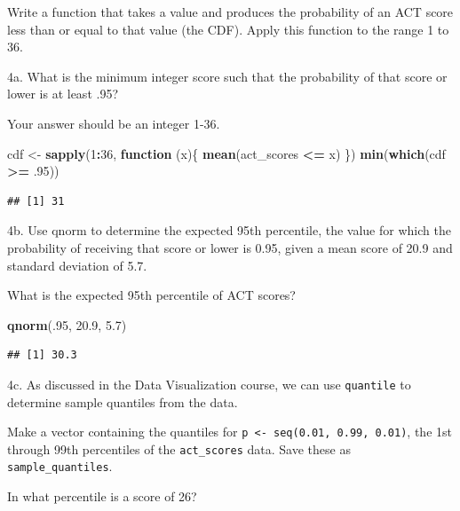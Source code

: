 \documentclass[
]{article}
\newenvironment{Shaded}{\begin{snugshade}}{\end{snugshade}}
\newcommand{\ControlFlowTok}[1]{\textcolor[rgb]{0.13,0.29,0.53}{\textbf{#1}}}
\newcommand{\DecValTok}[1]{\textcolor[rgb]{0.00,0.00,0.81}{#1}}
\newcommand{\FloatTok}[1]{\textcolor[rgb]{0.00,0.00,0.81}{#1}}
\newcommand{\KeywordTok}[1]{\textcolor[rgb]{0.13,0.29,0.53}{\textbf{#1}}}
\newcommand{\NormalTok}[1]{#1}
\newcommand{\OperatorTok}[1]{\textcolor[rgb]{0.81,0.36,0.00}{\textbf{#1}}}
\newcommand{\StringTok}[1]{\textcolor[rgb]{0.31,0.60,0.02}{#1}}
\begin{document}
Write a function that takes a value and produces the probability of an
ACT score less than or equal to that value (the CDF). Apply this
function to the range 1 to 36.

4a. What is the minimum integer score such that the probability of that
score or lower is at least .95?

Your answer should be an integer 1-36.

\begin{Shaded}
\begin{Highlighting}[]
\NormalTok{cdf \textless{}{-}}\StringTok{ }\KeywordTok{sapply}\NormalTok{(}\DecValTok{1}\OperatorTok{:}\DecValTok{36}\NormalTok{, }\ControlFlowTok{function}\NormalTok{ (x)\{}
  \KeywordTok{mean}\NormalTok{(act\_scores }\OperatorTok{\textless{}=}\StringTok{ }\NormalTok{x)}
\NormalTok{\})}
\KeywordTok{min}\NormalTok{(}\KeywordTok{which}\NormalTok{(cdf }\OperatorTok{\textgreater{}=}\StringTok{ }\FloatTok{.95}\NormalTok{))}
\end{Highlighting}
\end{Shaded}

\begin{verbatim}
## [1] 31
\end{verbatim}

4b. Use qnorm to determine the expected 95th percentile, the value for
which the probability of receiving that score or lower is 0.95, given a
mean score of 20.9 and standard deviation of 5.7.

What is the expected 95th percentile of ACT scores?

\begin{Shaded}
\begin{Highlighting}[]
\KeywordTok{qnorm}\NormalTok{(.}\DecValTok{95}\NormalTok{, }\FloatTok{20.9}\NormalTok{, }\FloatTok{5.7}\NormalTok{)}
\end{Highlighting}
\end{Shaded}

\begin{verbatim}
## [1] 30.3
\end{verbatim}

4c. As discussed in the Data Visualization course, we can use
\texttt{quantile} to determine sample quantiles from the data.

Make a vector containing the quantiles for
\texttt{p\ \textless{}-\ seq(0.01,\ 0.99,\ 0.01)}, the 1st through 99th
percentiles of the \texttt{act\_scores} data. Save these as
\texttt{sample\_quantiles}.

In what percentile is a score of 26?
\end{document}
